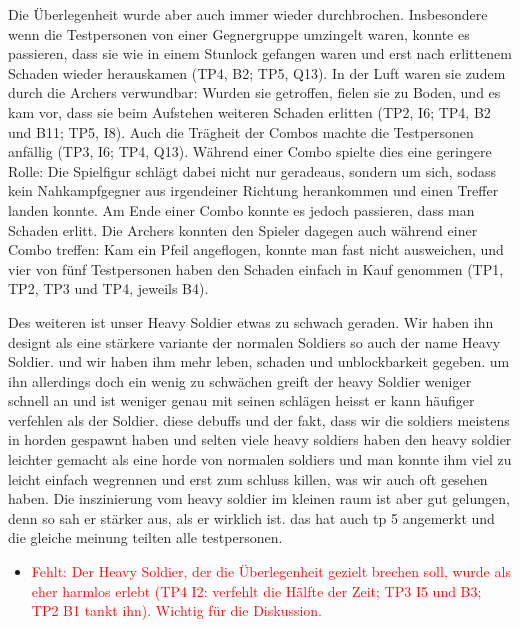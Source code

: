 \documentclass[../Main.tex]{subfiles}
\begin{document}
Die Überlegenheit wurde aber auch immer wieder durchbrochen. Insbesondere wenn die Testpersonen von einer Gegnergruppe umzingelt waren, konnte es passieren, dass sie wie in einem Stunlock gefangen waren und erst nach erlittenem Schaden wieder herauskamen (TP4, B2; TP5, Q13). In der Luft waren sie zudem durch die Archers verwundbar: Wurden sie getroffen, fielen sie zu Boden, und es kam vor, dass sie beim Aufstehen weiteren Schaden erlitten (TP2, I6; TP4, B2 und B11; TP5, I8). Auch die Trägheit der Combos machte die Testpersonen anfällig (TP3, I6; TP4, Q13). Während einer Combo spielte dies eine geringere Rolle: Die Spielfigur schlägt dabei nicht nur geradeaus, sondern um sich, sodass kein Nahkampfgegner aus irgendeiner Richtung herankommen und einen Treffer landen konnte. Am Ende einer Combo konnte es jedoch passieren, dass man Schaden erlitt. Die Archers konnten den Spieler dagegen auch während einer Combo treffen: Kam ein Pfeil angeflogen, konnte man fast nicht ausweichen, und vier von fünf Testpersonen haben den Schaden einfach in Kauf genommen (TP1, TP2, TP3 und TP4, jeweils B4).

Des weiteren ist unser Heavy Soldier etwas zu schwach geraden. Wir haben ihn designt als eine stärkere variante der normalen Soldiers so auch der name Heavy Soldier. und wir haben ihm mehr leben, schaden und unblockbarkeit gegeben. um ihn allerdings doch ein wenig zu schwächen greift der heavy Soldier weniger schnell an und ist weniger genau mit seinen schlägen heisst er kann häufiger verfehlen als der Soldier. diese debuffs und der fakt, dass wir die soldiers meistens in horden gespawnt haben und selten viele heavy soldiers haben den heavy soldier leichter gemacht als eine horde von normalen soldiers und man konnte ihm viel zu leicht einfach wegrennen und erst zum schluss killen, was wir auch oft gesehen haben. Die inszinierung vom heavy soldier im kleinen raum ist aber gut gelungen, denn so sah er stärker aus, als er wirklich ist. das hat auch tp 5 angemerkt und die gleiche meinung teilten alle testpersonen.

\begin{itemize}[leftmargin=1.5cm]
    \item \textcolor{red}{Fehlt: Der Heavy Soldier, der die Überlegenheit gezielt brechen soll, wurde als eher harmlos erlebt (TP4 I2: verfehlt die Hälfte der Zeit; TP3 I5 und B3; TP2 B1 tankt ihn). Wichtig für die Diskussion.}
\end{itemize}
\end{document}

